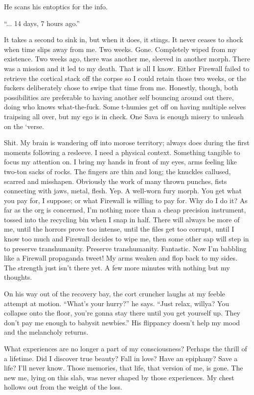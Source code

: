 He scans his entoptics for the info.

``... 14 days, 7 hours ago.''

It takes a second to sink in, but when it does, it stings. It never ceases to shock when time slips away from me. Two weeks. Gone. Completely wiped from my existence. Two weeks ago, there was another me, sleeved in another morph. There was a mission and it led to my death. That is all I know. Either Firewall failed to retrieve the cortical stack off the corpse so I could retain those two weeks, or the fuckers deliberately chose to swipe that time from me. Honestly, though, both possibilities are preferable to having another self bouncing around out there, doing who knows what-the-fuck. Some t-humies get off on having multiple selves traipsing all over, but my ego is in check. One Sava is enough misery to unleash on the ‘verse.

Shit. My brain is wandering off into morose territory; always does during the first moments following a resleeve. I need a physical context. Something tangible to focus my attention on. I bring my hands in front of my eyes, arms feeling like two-ton sacks of rocks. The fingers are thin and long; the knuckles callused, scarred and misshapen. Obviously the work of many thrown punches, fists connecting with jaws, metal, flesh. Yep. A well-worn fury morph. You get what you pay for, I suppose; or what Firewall is willing to pay for. Why do I do it? As far as the org is concerned, I'm nothing more than a cheap precision instrument, tossed into the recycling bin when I snap in half. There will always be more of me, until the horrors prove too intense, until the files get too corrupt, until I know too much and Firewall decides to wipe me, then some other sap will step in to preserve transhumanity. Preserve transhumanity. Fantastic. Now I'm babbling like a Firewall propaganda tweet! My arms weaken and flop back to my sides. The strength just isn't there yet. A few more minutes with nothing but my thoughts.

On his way out of the recovery bay, the cort cruncher laughs at my feeble attempt at motion. ``What's your hurry?'' he says. ``Just relax, willya? You collapse onto the floor, you're gonna stay there until you get yourself up. They don't pay me enough to babysit newbies.'' His flippancy doesn't help my mood and the melancholy returns.

What experiences are no longer a part of my consciousness? Perhaps the thrill of a lifetime. Did I discover true beauty? Fall in love? Have an epiphany? Save a life? I'll never know. Those memories, that life, that version of me, is gone. The new me, lying on this slab, was never shaped by those experiences. My chest hollows out from the weight of the loss.

